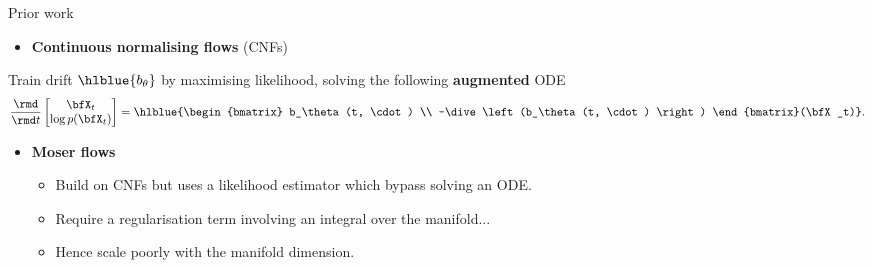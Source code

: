    \begin{frame}{Prior work}
   
   
   \begin{itemize} [triangle]
       \item \textbf{Continuous normalising flows} (CNFs)~\cite{mathieu2020riemannian,falorsi2021Continuous}
   \end{itemize}
   Train drift $\hlblue{b_\theta}$ by maximising likelihood, solving the following \textbf{augmented} ODE
   \begin{equation}
       \frac{\rmd}{\rmd t} 
       \begin{bmatrix} \bfX_t \\ \log p(\bfX_t) \end{bmatrix}
       = \hlblue{\begin{bmatrix} b_\theta(t, \cdot) \\ -\dive\left(b_\theta(t, \cdot) \right) \end{bmatrix}(\bfX_t)}.
   \end{equation}
   \pause
   
   \begin{itemize} [triangle]
       \item \textbf{Moser flows}~\cite{rozen2021moser}
   \begin{itemize}
       \item Build on CNFs but uses a likelihood estimator which bypass solving an ODE.
       \item Require a regularisation term involving an integral over the manifold...
       \item Hence scale poorly with the manifold dimension.
   \end{itemize}
   \end{itemize}
   \end{frame}
   
